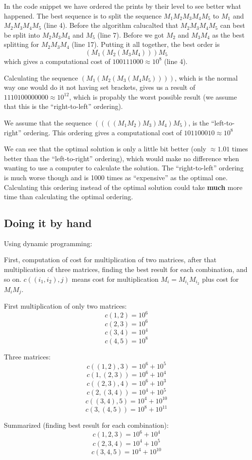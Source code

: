 In the code snippet we have ordered the prints by their level to see better what happened. 
The best sequence is to split the sequence $M_{1}M_{2}M_{3}M_{4}M_{5}$ to $M_{1}$
and $M_{2}M_{3}M_{4}M_{5}$ (line 4). Before the algorithm calucalted that $M_{2}M_{3}M_{4}M_{5}$ can 
best be split into $M_{2}M_{3}M_{4}$ and $M_{5}$ (line 7). Before we got $M_{2}$ and $M_{3}M_{4}$ as the best 
splitting for $M_{2}M_{3}M_{4}$ (line 17). Putting it all together, the best order is 
\[
	(M_{1}(M_{2}(M_{3}M_{4})))M_{5}
\]
which gives a computational cost of $100111000 \approx {10}^8$ (line 4).

Calculating the sequence $(M_{1}(M_{2}(M_{3}(M_{4}M_{5}))))$, which is the normal way one 
would do it not having set brackets, gives us a result of $1110100000000 \approx {10}^{12}$, which 
is propably the worst possible result (we assume that this is the ``right-to-left'' ordering).

We assume that the sequence $((((M_{1}M_{2})M_{3})M_{4})M_{5})$, is the ``left-to-right'' ordering.
This ordering gives a computational cost of $101100010 \approx {10}^8$

We can see that the optimal solution is only a little bit better (only $\approx 1.01$ times better than the ``left-to-right'' ordering), 
which would make no difference when wanting to use a computer to calculate the solution. The ``right-to-left'' ordering is much worse though 
and is 1000 times as ``expensive'' as the optimal one. Calculating this ordering instead of the optimal solution could take \textbf{much} more
time than calculating the optimal ordering.

\subsection*{Doing it by hand}
Using dynamic programming: 

First, computation of cost for multiplication of two matrices, after that multiplication of three matrices, finding the best result for each combination, and so on.
\(c((i_1,i_2),j)\) means cost for multiplication \(M_i=M_{i_1}M_{i_2}\) plus cost for \(M_iM_j\).

First multiplication of only two matrices:
\[c(1,2)=10^6\]
\[c(2,3)=10^6\]
\[c(3,4)=10^4\]
\[c(4,5)=10^8\]

Three matrices:
\[c((1,2),3)=10^6+10^5\]
\[c(1,(2,3))=10^6+10^4\]
\[c((2,3),4)=10^6+10^3\]
\[c(2,(3,4))=10^4+10^5\]
\[c((3,4),5)=10^4+10^{10}\]
\[c(3,(4,5))=10^8+10^{11}\]

Summarized (finding best result for each combination): 
\[c(1,2,3)=10^6+10^4\]
\[c(2,3,4)=10^4+10^5\]
\[c(3,4,5)=10^4+10^{10}\]

